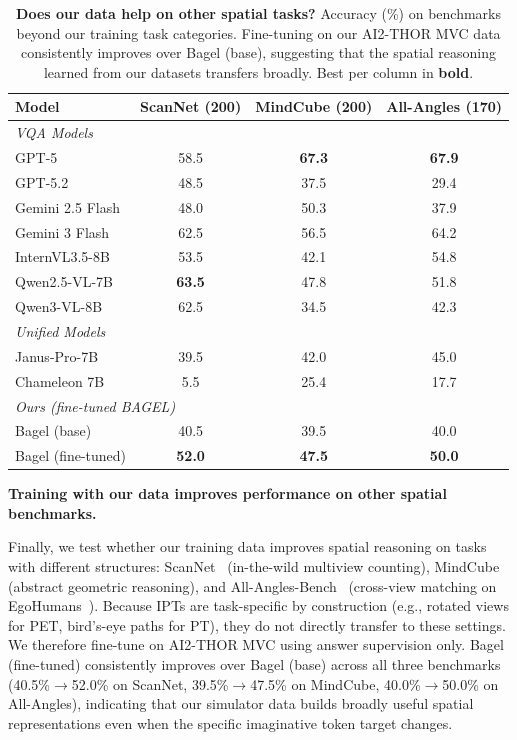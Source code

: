 \documentclass{llmxive}
\begin{document}
\begin{table}[t]
  \vspace{-1em}
  \centering
  \setlength{\tabcolsep}{4pt}
  \small
  \begin{tabular}{l ccc}
    \toprule
    \textbf{Model}
      & \footnotesize ScanNet (200)
      & \footnotesize MindCube (200)
      & \footnotesize All-Angles (170) \\
    \midrule
    \multicolumn{4}{l}{\emph{VQA Models}} \\
    GPT-5            & 58.5 & \textbf{67.3} & \textbf{67.9} \\
    GPT-5.2          & 48.5 & 37.5 & 29.4 \\
    Gemini 2.5 Flash & 48.0 & 50.3 & 37.9 \\
    Gemini 3 Flash   & 62.5 & 56.5 & 64.2 \\
    InternVL3.5-8B   & 53.5 & 42.1 & 54.8 \\
    Qwen2.5-VL-7B   & \textbf{63.5} & 47.8 & 51.8 \\
    Qwen3-VL-8B     & 62.5 & 34.5 & 42.3 \\
    \midrule
    \multicolumn{4}{l}{\emph{Unified Models}} \\
    Janus-Pro-7B     & 39.5 & 42.0 & 45.0 \\
    Chameleon 7B     & 5.5 & 25.4 & 17.7 \\
    \midrule
    \multicolumn{4}{l}{\emph{Ours (fine-tuned BAGEL)}} \\
    Bagel (base)       & 40.5 & 39.5 & 40.0 \\
    Bagel (fine-tuned) & \textbf{52.0} & \textbf{47.5} & \textbf{50.0} \\
    \bottomrule
  \end{tabular}
  \label{tab:ablation_data}
\caption{\textbf{Does our data help on other spatial tasks?} Accuracy (\%) on benchmarks beyond our training task categories. Fine-tuning on our AI2-THOR MVC data consistently improves over Bagel (base), suggesting that the spatial reasoning learned from our datasets transfers broadly. Best per column in \textbf{bold}.}
\end{table}


\begin{takeawayblock}
    \textbf{Training with our data improves performance on other spatial benchmarks.}
\end{takeawayblock}
Finally, we test whether our training data improves spatial reasoning on tasks with different structures: ScanNet~\cite{dai2017scannet} (in-the-wild multiview counting), MindCube~\cite{yin2025mindcube} (abstract geometric reasoning), and All-Angles-Bench~\cite{yeh2025seeing} (cross-view matching on EgoHumans~\cite{khirodkar2023egohumans}).
Because IPTs are task-specific by construction (e.g., rotated views for PET, bird's-eye paths for PT), they do not directly transfer to these settings. We therefore fine-tune on AI2-THOR MVC using answer supervision only.
Bagel (fine-tuned) consistently improves over Bagel (base) across all three benchmarks (40.5\%$\to$52.0\% on ScanNet, 39.5\%$\to$47.5\% on MindCube, 40.0\%$\to$50.0\% on All-Angles), indicating that our simulator data builds broadly useful spatial representations even when the specific imaginative token target changes.
\end{document}
